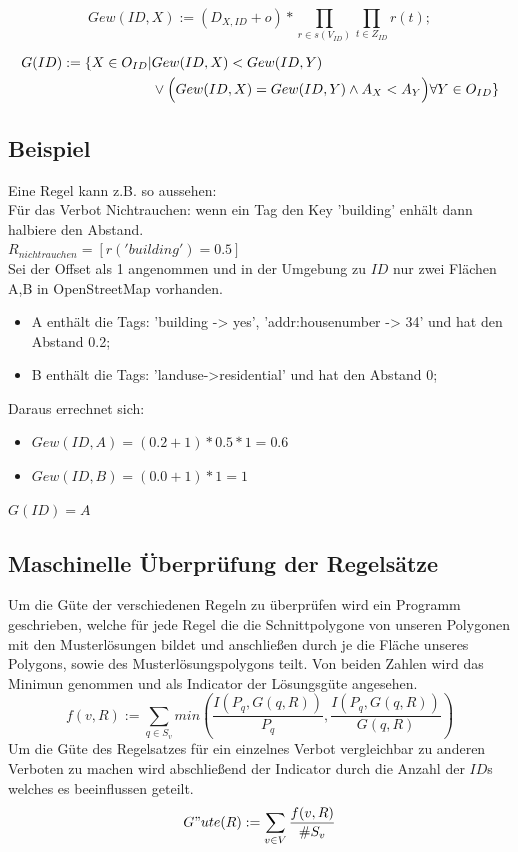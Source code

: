 \begin{equation}
Gew(ID,X) := (D_{X,ID} + o) * \prod_{r \in s(V_{ID})} \prod_{t \in Z_{ID}} r(t);
\end{equation}

\begin{align}
G(ID) := \{X \in O_{ID} | & Gew(ID,X) < Gew(ID,Y)\\
& \lor \Big(Gew(ID,X)=Gew(ID,Y) \land A_X < A_Y\Big) \forall Y \in O_{ID}\} \notag
\end{align}

\subsection{Beispiel}
Eine Regel kann z.B. so aussehen:\\
Für das Verbot Nichtrauchen: wenn ein Tag den Key 'building' enhält dann halbiere den Abstand. \\
$R_{nichtrauchen} = [r('building') = 0.5]$\\
\newline
Sei der Offset als 1 angenommen und in der Umgebung zu $ID$ nur zwei
Flächen A,B in OpenStreetMap vorhanden.
\begin{itemize}
\item A enthält die Tags: 'building -> yes', 'addr:housenumber -> 34' und hat den Abstand 0.2;
\item B enthält die Tags: 'landuse->residential' und hat den Abstand 0;
\end{itemize}
Daraus errechnet sich:
\begin{itemize}
\item $Gew(ID,A) = (0.2 + 1) * 0.5 * 1 = 0.6$
\item $Gew(ID,B) = (0.0 + 1) * 1 = 1$
\end{itemize}

$G(ID) = A$

\subsection{Maschinelle Überprüfung der Regelsätze}
Um die Güte der verschiedenen Regeln zu überprüfen wird ein Programm geschrieben, welche für jede Regel die die Schnittpolygone von unseren Polygonen mit
den Musterlösungen bildet und anschließen durch je die Fläche unseres Polygons, sowie des Musterlösungspolygons teilt.
Von beiden Zahlen wird das Minimun genommen und als Indicator der Lösungsgüte angesehen.\\
\begin{equation}
f(v,R) := \sum_{q\in S_v} min(\frac{I(P_q,G(q,R))}{P_q},\frac{I(P_q,G(q,R))}{G(q,R)})
\end{equation}
Um die Güte des Regelsatzes für ein einzelnes Verbot vergleichbar zu anderen Verboten zu machen wird abschließend der Indicator durch
die Anzahl der $ID$s welches es beeinflussen geteilt.\\
\begin{equation}
\label{eq:guete}
G"ute(R) := \sum_{v \in V} \frac{ f(v,R)}{\#S_v}
\end{equation}


